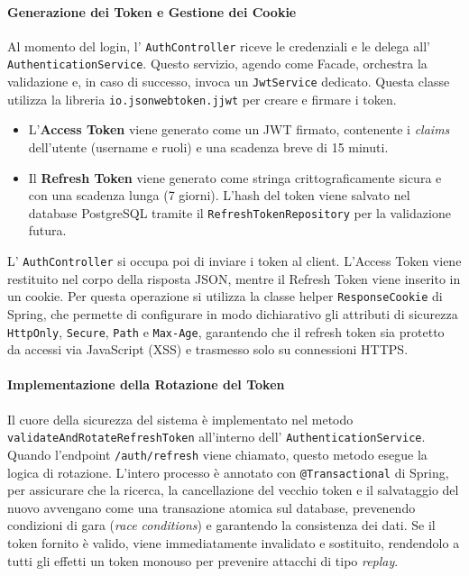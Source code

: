 \documentclass[12pt,a4paper,openright,twoside]{book}
\begin{document}
\paragraph{Generazione dei Token e Gestione dei Cookie}
Al momento del login, l' \texttt{Auth\allowbreak Controller} riceve le credenziali e le delega all' \texttt{Authentication\allowbreak Service}. Questo servizio, agendo come Facade, orchestra la validazione e, in caso di successo, invoca un \texttt{Jwt\allowbreak Service} dedicato. Questa classe utilizza la libreria \texttt{io.\allowbreak jsonwebtoken.\allowbreak jjwt} per creare e firmare i token.
\begin{itemize}
    \item L'\textbf{Access Token} viene generato come un JWT firmato, contenente i \textit{claims} dell'utente (username e ruoli) e una scadenza breve di 15 minuti.
    \item Il \textbf{Refresh Token} viene generato come stringa crittograficamente sicura e con una scadenza lunga (7 giorni). L'hash del token viene salvato nel database PostgreSQL tramite il \texttt{RefreshTokenRepository} per la validazione futura.
\end{itemize}
L' \texttt{AuthController} si occupa poi di inviare i token al client. L'Access Token viene restituito nel corpo della risposta JSON, mentre il Refresh Token viene inserito in un cookie. Per questa operazione si utilizza la classe helper \texttt{ResponseCookie} di Spring, che permette di configurare in modo dichiarativo gli attributi di sicurezza \texttt{HttpOnly}, \texttt{Secure}, \texttt{Path} e \texttt{Max-Age}, garantendo che il refresh token sia protetto da accessi via JavaScript (XSS) e trasmesso solo su connessioni HTTPS.

\paragraph{Implementazione della Rotazione del Token}
Il cuore della sicurezza del sistema è implementato nel metodo \texttt{validateAndRotateRefreshToken} all'interno dell' \texttt{AuthenticationService}. Quando l'endpoint \texttt{/auth/refresh} viene chiamato, questo metodo esegue la logica di rotazione. L'intero processo è annotato con \texttt{@Transactional} di Spring, per assicurare che la ricerca, la cancellazione del vecchio token e il salvataggio del nuovo avvengano come una transazione atomica sul database, prevenendo condizioni di gara (\textit{race conditions}) e garantendo la consistenza dei dati. Se il token fornito è valido, viene immediatamente invalidato e sostituito, rendendolo a tutti gli effetti un token monouso per prevenire attacchi di tipo \textit{replay}.
\end{document}
